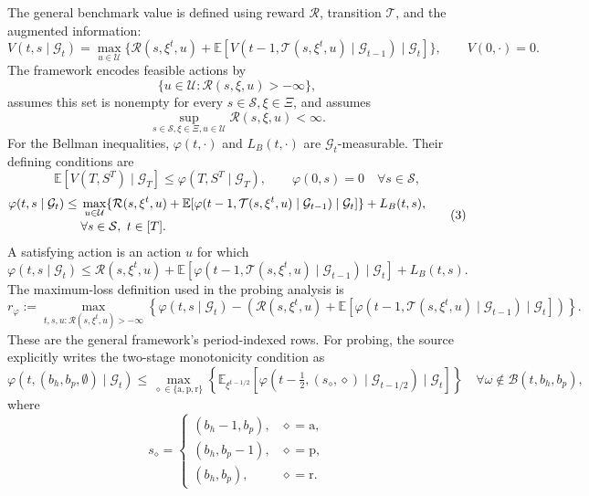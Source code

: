 \documentclass{article}
\begin{document}
The general benchmark value is defined using reward $\mathcal R$, transition $\mathcal T$, and the augmented information:
\begin{equation}
V(t,s\mid\mathcal G_t)=\max_{u\in\mathcal U}
\{\mathcal R(s,\xi^t,u)+
\mathbb E[V(t-1,\mathcal T(s,\xi^t,u)\mid\mathcal G_{t-1})\mid\mathcal G_t]\},
\qquad V(0,\cdot)=0.
\tag{2}
\end{equation}
The framework encodes feasible actions by
\[
\{u\in\mathcal U:\mathcal R(s,\xi,u)>-\infty\},
\]
assumes this set is nonempty for every $s\in\mathcal S,\xi\in\Xi$, and assumes
\[
\sup_{s\in\mathcal S,\xi\in\Xi,u\in\mathcal U}\mathcal R(s,\xi,u)<\infty.
\]
For the Bellman inequalities, $\varphi(t,\cdot)$ and $L_B(t,\cdot)$ are $\mathcal G_t$-measurable. Their defining conditions are
\[
\mathbb E[V(T,S^T)\mid\mathcal G_T]
\le\varphi(T,S^T\mid\mathcal G_T),
\qquad
\varphi(0,s)=0\quad\forall s\in\mathcal S,
\]
\begin{equation}
\begin{aligned}
\varphi(t,s\mid\mathcal G_t)
\le{}&\max_{u\in\mathcal U}
\{\mathcal R(s,\xi^t,u)+
\mathbb E[\varphi(t-1,\mathcal T(s,\xi^t,u)\mid\mathcal G_{t-1})\mid\mathcal G_t]\}
+L_B(t,s),\\[-2pt]
&\hfill\forall s\in\mathcal S,\ t\in[T].
\end{aligned}\tag{3}
\end{equation}
A satisfying action is an action $u$ for which
\begin{equation}
\varphi(t,s\mid\mathcal G_t)
\le\mathcal R(s,\xi^t,u)+
\mathbb E[\varphi(t-1,\mathcal T(s,\xi^t,u)\mid\mathcal G_{t-1})\mid\mathcal G_t]
+L_B(t,s).
\tag{4}
\end{equation}
The maximum-loss definition used in the probing analysis is
\[
r_\varphi:=
\max_{t,s,u:\mathcal R(s,\xi^t,u)>-\infty}
\left\{\varphi(t,s\mid\mathcal G_t)-
\left(\mathcal R(s,\xi^t,u)+
\mathbb E[\varphi(t-1,\mathcal T(s,\xi^t,u)\mid\mathcal G_{t-1})\mid\mathcal G_t]\right)\right\}.
\]
These are the general framework's period-indexed rows. For probing, the source explicitly writes the two-stage monotonicity condition as
\[
\varphi(t,(b_h,b_p,\emptyset)\mid\mathcal G_t)
\le\max_{\diamond\in\{\mathrm a,\mathrm p,\mathrm r\}}
\left\{\mathbb E_{\xi^{t-1/2}}
[\varphi(t-\tfrac12,(s_\diamond,\diamond)\mid\mathcal G_{t-1/2})\mid\mathcal G_t]\right\}
\quad\forall\omega\notin\mathcal B(t,b_h,b_p),
\]
where
\[
s_\diamond=
\begin{cases}
(b_h-1,b_p),&\diamond=\mathrm a,\\
(b_h,b_p-1),&\diamond=\mathrm p,\\
(b_h,b_p),&\diamond=\mathrm r.
\end{cases}
\]
\end{document}
